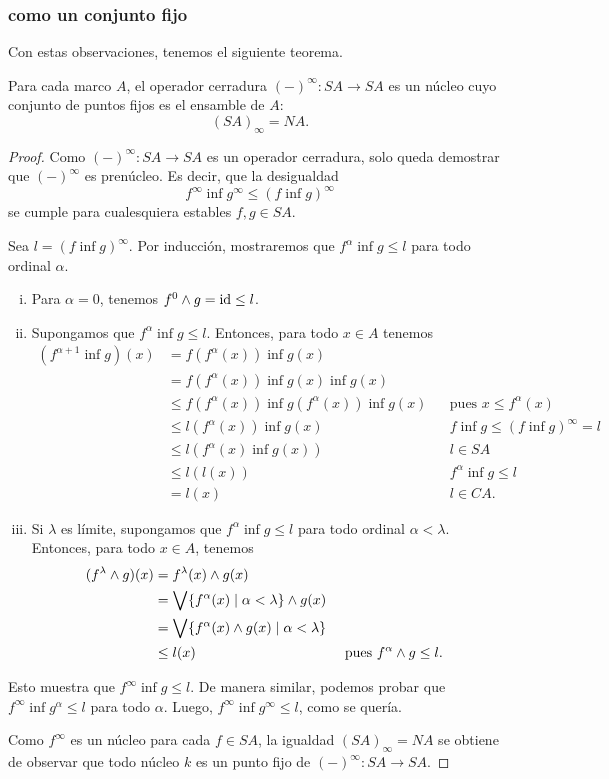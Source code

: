 \subsubsection{ como un conjunto fijo}
Con estas observaciones, tenemos el siguiente teorema.
\begin{theorem}
  Para cada marco $A$, el operador cerradura $({-})^\infty:SA\to
  SA$ es un núcleo cuyo conjunto de puntos fijos es el ensamble
  de $A$:
  \[
    (SA)_\infty = NA
  .\]
\end{theorem}
\begin{proof}
  Como $({-})^\infty:SA\to SA$ es un operador cerradura,
  solo queda demostrar que $(-)^\infty$ es prenúcleo.
  Es decir, que la desigualdad
  \[
    f^\infty \inf g^\infty \leq (f\inf g)^\infty
  \]
  se cumple para cualesquiera estables $f,g\in SA$.

  Sea $l=(f \inf g)^\infty$.
  Por inducción, mostraremos que $f^\alpha\inf g\leq l$ para todo
  ordinal $\alpha$.
  \begin{enumerate}[(i)]
    \item Para $\alpha=0$, tenemos $f^0\wedge g=\mathrm{id} \leq l$.
    \item Supongamos que $f^\alpha\inf g\leq l$.
    Entonces, para todo $x\in A$ tenemos
    \begin{align*}
      (f^{\alpha+1}\inf g)(x)
      &= f(f^\alpha(x)) \inf g(x) \\
      &= f(f^\alpha(x)) \inf g(x) \inf g(x) \\
      &\leq f(f^\alpha(x)) \inf g(f^\alpha(x)) \inf g(x)
        && \text{pues } x\leq f^\alpha(x) \\
      &\leq l(f^\alpha(x)) \inf g(x) && f\inf g\leq (f\inf
      g)^\infty =l \\
      &\leq l(f^\alpha(x) \inf g(x)) && l\in SA \\
      &\leq l(l(x)) && f^\alpha\inf g\leq l \\
      &= l(x) && l\in CA.
    \end{align*}
    \item
    Si $\lambda$ es límite, supongamos que $f^\alpha\inf g\leq l$
    para todo ordinal $\alpha <\lambda$.
    Entonces, para todo $x\in A$, tenemos
    \begin{align*}
      (f^\lambda\wedge g)(x)
      &= f^\lambda(x) \wedge g(x) \\
      &= \bigvee\{f^\alpha(x) \mid \alpha<\lambda\} \wedge g(x) \\
      &= \bigvee\{f^\alpha(x)\wedge g(x) \mid \alpha<\lambda\} \\
      &\leq l(x) && \text{ pues } f^\alpha\wedge g\leq l.
    \end{align*}
  \end{enumerate}
  Esto muestra que $f^\infty \inf g\leq l$.
  De manera similar, podemos probar que $f^\infty \inf
  g^\alpha\leq l$ para todo $\alpha$.
  Luego, $f^\infty \inf g^\infty \leq l$, como se quería.

  Como $f^\infty$ es un núcleo para cada $f\in SA$, la
  igualdad $(SA)_\infty=NA$ se obtiene de observar que todo
  núcleo $k$ es un punto fijo de $({-})^\infty:SA\to SA$.
\end{proof}


